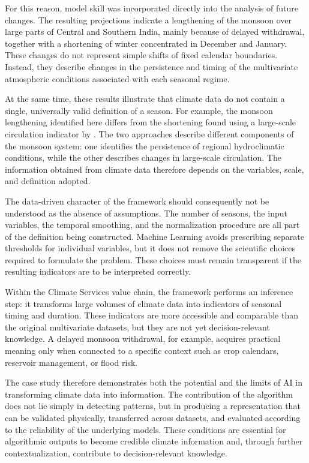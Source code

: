 For this reason, model skill was incorporated directly into the analysis of future changes. The resulting projections indicate a lengthening of the monsoon over large parts of Central and Southern India, mainly because of delayed withdrawal, together with a shortening of winter concentrated in December and January. These changes do not represent simple shifts of fixed calendar boundaries. Instead, they describe changes in the persistence and timing of the multivariate atmospheric conditions associated with each seasonal regime.

At the same time, these results illustrate that climate data do not contain a single, universally valid definition of a season. For example, the monsoon lengthening identified here differs from the shortening found using a large-scale circulation indicator by \citet{cheng_shorter_2025}. The two approaches describe different components of the monsoon system: one identifies the persistence of regional hydroclimatic conditions, while the other describes changes in large-scale circulation. The information obtained from climate data therefore depends on the variables, scale, and definition adopted.

The data-driven character of the framework should consequently not be understood as the absence of assumptions. The number of seasons, the input variables, the temporal smoothing, and the normalization procedure are all part of the definition being constructed. Machine Learning avoids prescribing separate thresholds for individual variables, but it does not remove the scientific choices required to formulate the problem. These choices must remain transparent if the resulting indicators are to be interpreted correctly.

Within the Climate Services value chain, the framework performs an inference step: it transforms large volumes of climate data into indicators of seasonal timing and duration. These indicators are more accessible and comparable than the original multivariate datasets, but they are not yet decision-relevant knowledge. A delayed monsoon withdrawal, for example, acquires practical meaning only when connected to a specific context such as crop calendars, reservoir management, or flood risk.

The case study therefore demonstrates both the potential and the limits of AI in transforming climate data into information. The contribution of the algorithm does not lie simply in detecting patterns, but in producing a representation that can be validated physically, transferred across datasets, and evaluated according to the reliability of the underlying models. These conditions are essential for algorithmic outputs to become credible climate information and, through further contextualization, contribute to decision-relevant knowledge.